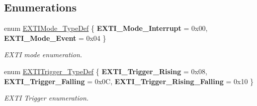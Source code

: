 \subsection*{Enumerations}
\begin{DoxyCompactItemize}
\item 
enum \hyperlink{group___e_x_t_i_gad5e69af98dc0dfdf64417adc1cf57929}{E\-X\-T\-I\-Mode\-\_\-\-Type\-Def} \{ {\bfseries E\-X\-T\-I\-\_\-\-Mode\-\_\-\-Interrupt} = 0x00, 
{\bfseries E\-X\-T\-I\-\_\-\-Mode\-\_\-\-Event} = 0x04
 \}
\begin{DoxyCompactList}\small\item\em E\-X\-T\-I mode enumeration. \end{DoxyCompactList}\item 
enum \hyperlink{group___e_x_t_i_ga9da190f5425d1b421a06bced8cc48e9b}{E\-X\-T\-I\-Trigger\-\_\-\-Type\-Def} \{ {\bfseries E\-X\-T\-I\-\_\-\-Trigger\-\_\-\-Rising} = 0x08, 
{\bfseries E\-X\-T\-I\-\_\-\-Trigger\-\_\-\-Falling} = 0x0\-C, 
{\bfseries E\-X\-T\-I\-\_\-\-Trigger\-\_\-\-Rising\-\_\-\-Falling} = 0x10
 \}
\begin{DoxyCompactList}\small\item\em E\-X\-T\-I Trigger enumeration. \end{DoxyCompactList}\end{DoxyCompactItemize}
